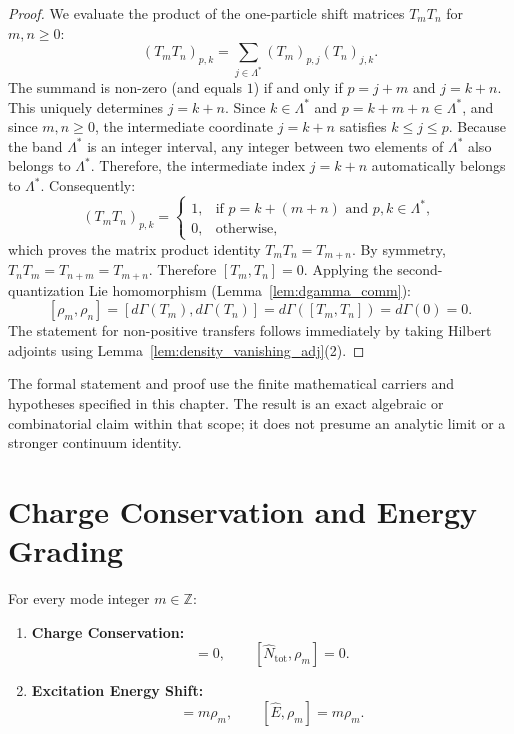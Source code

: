 \begin{proof}
We evaluate the product of the one-particle shift matrices $T_m T_n$ for $m, n \ge 0$:
\[
(T_m T_n)_{p, k} = \sum_{j \in \Lambda^*} (T_m)_{p, j} (T_n)_{j, k}.
\]
The summand is non-zero (and equals $1$) if and only if $p = j + m$ and $j = k + n$. 
This uniquely determines $j = k + n$. Since $k \in \Lambda^*$ and $p = k + m + n \in \Lambda^*$, and since $m, n \ge 0$, the intermediate coordinate $j = k + n$ satisfies $k \le j \le p$.
Because the band $\Lambda^*$ is an integer interval, any integer between two elements of $\Lambda^*$ also belongs to $\Lambda^*$. Therefore, the intermediate index $j = k + n$ automatically belongs to $\Lambda^*$.
Consequently:
\[
(T_m T_n)_{p, k} = \begin{cases} 1, & \text{if } p = k + (m + n) \text{ and } p, k \in \Lambda^*, \\ 0, & \text{otherwise}, \end{cases}
\]
which proves the matrix product identity $T_m T_n = T_{m+n}$.
By symmetry, $T_n T_m = T_{n+m} = T_{m+n}$. Therefore $[T_m, T_n] = 0$.
Applying the second-quantization Lie homomorphism (Lemma~\ref{lem:dgamma_comm}):
\[
[\rho_m, \rho_n] = [d\Gamma(T_m), d\Gamma(T_n)] = d\Gamma([T_m, T_n]) = d\Gamma(0) = 0.
\]
The statement for non-positive transfers follows immediately by taking Hilbert adjoints using Lemma~\ref{lem:density_vanishing_adj}(2).
\end{proof}

\begin{remark}
The formal statement and proof use the finite mathematical carriers and hypotheses specified in this chapter. The result is an exact algebraic or combinatorial claim within that scope; it does not presume an analytic limit or a stronger continuum identity.
\end{remark}

\section{Charge Conservation and Energy Grading}

\begin{theorem}
\label{thm:charge_energy_covariance}
For every mode integer $m \in \mathbb{Z}$:
\begin{enumerate}
    \item \textbf{Charge Conservation:}
    \begin{equation}
    [\hat{N}, \rho_m] = 0, \qquad [\hat{N}_{\mathrm{tot}}, \rho_m] = 0.
    \end{equation}
    \item \textbf{Excitation Energy Shift:}
    \begin{equation}
    [\hat{P}, \rho_m] = m \rho_m, \qquad [\hat{E}, \rho_m] = m \rho_m.
    \end{equation}
\end{enumerate}
\end{theorem}

